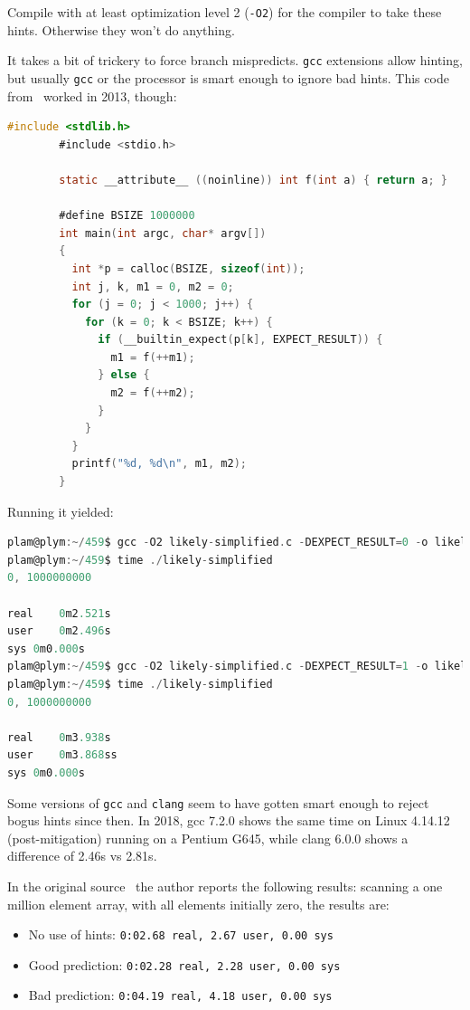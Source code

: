 \documentclass[a4paper]{report}
\begin{document}
Compile with at least optimization level 2 (\texttt{-O2}) for the compiler to take these hints. Otherwise they won't do anything. 

It takes a bit of trickery to force branch mispredicts. {\tt gcc} extensions allow hinting, but usually {\tt gcc} or the processor is smart enough to ignore bad hints. This code from~\cite{mispredict} worked in 2013, though:


\begin{lstlisting}[language=C]
        #include <stdlib.h>
        #include <stdio.h>

        static __attribute__ ((noinline)) int f(int a) { return a; }

        #define BSIZE 1000000
        int main(int argc, char* argv[]) 
        {
          int *p = calloc(BSIZE, sizeof(int));
          int j, k, m1 = 0, m2 = 0;
          for (j = 0; j < 1000; j++) {
            for (k = 0; k < BSIZE; k++) {
              if (__builtin_expect(p[k], EXPECT_RESULT)) {
                m1 = f(++m1);
              } else {
                m2 = f(++m2);
              }
            }
          }
          printf("%d, %d\n", m1, m2);
        }
\end{lstlisting}

Running it yielded:
\begin{lstlisting}[language=C]
plam@plym:~/459$ gcc -O2 likely-simplified.c -DEXPECT_RESULT=0 -o likely-simplified
plam@plym:~/459$ time ./likely-simplified
0, 1000000000

real	0m2.521s
user	0m2.496s
sys	0m0.000s
plam@plym:~/459$ gcc -O2 likely-simplified.c -DEXPECT_RESULT=1 -o likely-simplified
plam@plym:~/459$ time ./likely-simplified
0, 1000000000

real	0m3.938s
user	0m3.868ss
sys	0m0.000s
\end{lstlisting}
Some versions of {\tt gcc} and {\tt clang} seem to have gotten smart enough to reject bogus hints since then. In 2018, gcc 7.2.0 shows the same time on Linux 4.14.12 (post-mitigation) running on a Pentium G645, while clang 6.0.0 shows a difference of 2.46s vs 2.81s.

In the original source~\cite{mispredict} the author reports the following results: scanning a one million element array, with all elements initially zero, the results are:
\vspace*{-1em}
\begin{itemize}[noitemsep]
	\item No use of hints: \texttt{0:02.68 real,  2.67 user, 0.00 sys}
	\item Good prediction: \texttt{0:02.28 real,  2.28 user, 0.00 sys}
	\item Bad prediction: \texttt{0:04.19 real,  4.18 user, 0.00 sys}
\end{itemize}
\end{document}

